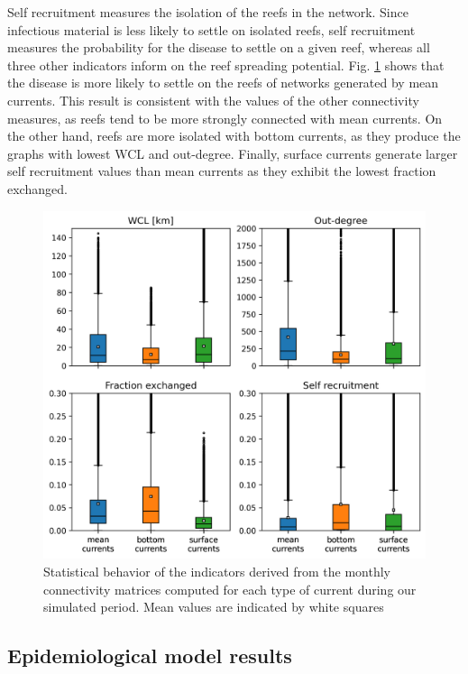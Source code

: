 \documentclass[utf8]{frontiersSCNS}
\begin{document}
Self recruitment measures the isolation of the reefs in the network. Since infectious material is less likely to settle on isolated reefs, self recruitment measures the probability for the disease to settle on a given reef, whereas all three other indicators inform on the reef spreading potential. Fig. \ref{fig:connect} shows that the disease is more likely to settle on the reefs of networks generated by mean currents. This result is consistent with the values of the other connectivity measures, as reefs tend to be more strongly connected with mean currents. On the other hand, reefs are more isolated with bottom currents, as they produce the graphs with lowest WCL and out-degree. Finally, surface currents generate larger self recruitment values than mean currents as they exhibit the lowest fraction exchanged. 

\begin{figure}
    \centering
    \includegraphics[width=.8\textwidth]{figures/connect_paper.png}
    \caption{Statistical behavior of the indicators derived from the monthly connectivity matrices computed for each type of current during our simulated period. Mean values are indicated by white squares}
    \label{fig:connect}
\end{figure}

\subsection{Epidemiological model results}
\end{document}
